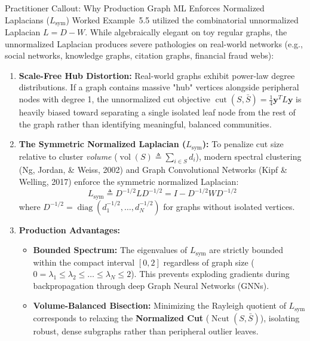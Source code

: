 \begin{intuitionbox}{Practitioner Callout: Why Production Graph ML Enforces Normalized Laplacians ($L_{\text{sym}}$)}
Worked Example~5.5 utilized the combinatorial unnormalized Laplacian $L = D - W$. While algebraically elegant on toy regular graphs, the unnormalized Laplacian produces severe pathologies on real-world networks (e.g., social networks, knowledge graphs, citation graphs, financial fraud webs):
\begin{enumerate}
    \item \textbf{Scale-Free Hub Distortion:} Real-world graphs exhibit power-law degree distributions. If a graph contains massive "hub" vertices alongside peripheral nodes with degree 1, the unnormalized cut objective $\operatorname{cut}(S, \bar{S}) = \frac{1}{4}\mathbf{y}^T L \mathbf{y}$ is heavily biased toward separating a single isolated leaf node from the rest of the graph rather than identifying meaningful, balanced communities.
    \item \textbf{The Symmetric Normalized Laplacian ($L_{\text{sym}}$):} To penalize cut size relative to cluster \emph{volume} ($\operatorname{vol}(S) \triangleq \sum_{i \in S} d_i$), modern spectral clustering (Ng, Jordan, \& Weiss, 2002) and Graph Convolutional Networks (Kipf \& Welling, 2017) enforce the symmetric normalized Laplacian:
    \begin{equation}
    L_{\text{sym}} \triangleq D^{-1/2} L D^{-1/2} = I - D^{-1/2} W D^{-1/2}
    \label{eq:normalized_laplacian_sym}
    \end{equation}
    where $D^{-1/2} = \operatorname{diag}(d_1^{-1/2}, \dots, d_N^{-1/2})$ for graphs without isolated vertices.
    \item \textbf{Production Advantages:}
    \begin{itemize}
        \item \textbf{Bounded Spectrum:} The eigenvalues of $L_{\text{sym}}$ are strictly bounded within the compact interval $[0, 2]$ regardless of graph size ($0 = \lambda_1 \le \lambda_2 \le \dots \le \lambda_N \le 2$). This prevents exploding gradients during backpropagation through deep Graph Neural Networks (GNNs).
        \item \textbf{Volume-Balanced Bisection:} Minimizing the Rayleigh quotient of $L_{\text{sym}}$ corresponds to relaxing the \textbf{Normalized Cut} ($\operatorname{Ncut}(S, \bar{S})$), isolating robust, dense subgraphs rather than peripheral outlier leaves.
    \end{itemize}
\end{enumerate}
\end{intuitionbox}


